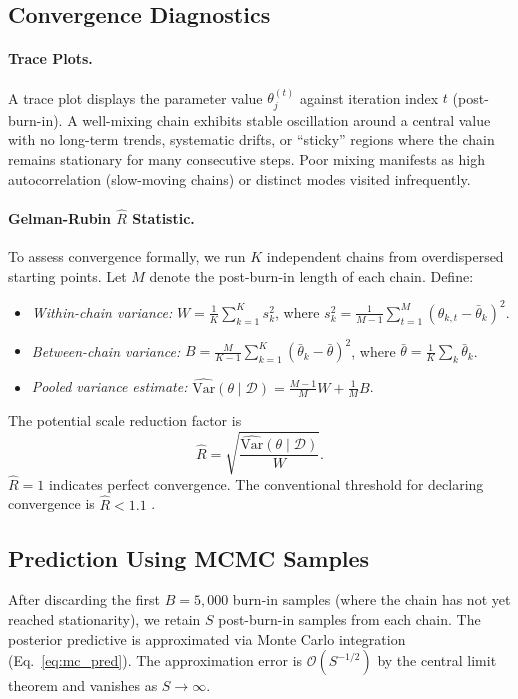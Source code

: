 \documentclass[12pt,a4paper]{article}
\newcommand{\D}{\mathcal{D}}
\begin{document}
\subsection{Convergence Diagnostics}

\paragraph{Trace Plots.}
A trace plot displays the parameter value $\theta_j^{(t)}$ against iteration
index $t$ (post-burn-in).
A well-mixing chain exhibits stable oscillation around a central value with
no long-term trends, systematic drifts, or ``sticky'' regions where the chain
remains stationary for many consecutive steps.
Poor mixing manifests as high autocorrelation (slow-moving chains) or
distinct modes visited infrequently.

\paragraph{Gelman-Rubin $\hat{R}$ Statistic.}
To assess convergence formally, we run $K$ independent chains from
overdispersed starting points.
Let $M$ denote the post-burn-in length of each chain.
Define:
\begin{itemize}
  \item \emph{Within-chain variance:}
    $W = \frac{1}{K}\sum_{k=1}^{K} s_k^2$,
    where $s_k^2 = \frac{1}{M-1}\sum_{t=1}^{M}(\theta_{k,t} - \bar{\theta}_k)^2$.
  \item \emph{Between-chain variance:}
    $B = \frac{M}{K-1}\sum_{k=1}^{K}(\bar{\theta}_k - \bar{\theta})^2$,
    where $\bar{\theta} = \frac{1}{K}\sum_k \bar{\theta}_k$.
  \item \emph{Pooled variance estimate:}
    $\widehat{\mathrm{Var}}(\theta \mid \D) = \frac{M-1}{M}W + \frac{1}{M}B$.
\end{itemize}
The potential scale reduction factor is
\begin{equation}
  \hat{R} = \sqrt{\frac{\widehat{\mathrm{Var}}(\theta \mid \D)}{W}}.
  \label{eq:rhat}
\end{equation}
$\hat{R} = 1$ indicates perfect convergence.
The conventional threshold for declaring convergence is $\hat{R} < 1.1$
\citep{gelman1992inference}.

\subsection{Prediction Using MCMC Samples}

After discarding the first $B = 5{,}000$ burn-in samples (where the chain
has not yet reached stationarity), we retain $S$ post-burn-in samples from
each chain.
The posterior predictive is approximated via Monte Carlo integration
(Eq.~\eqref{eq:mc_pred}).
The approximation error is $\mathcal{O}(S^{-1/2})$ by the central limit theorem
and vanishes as $S \to \infty$.
\end{document}
